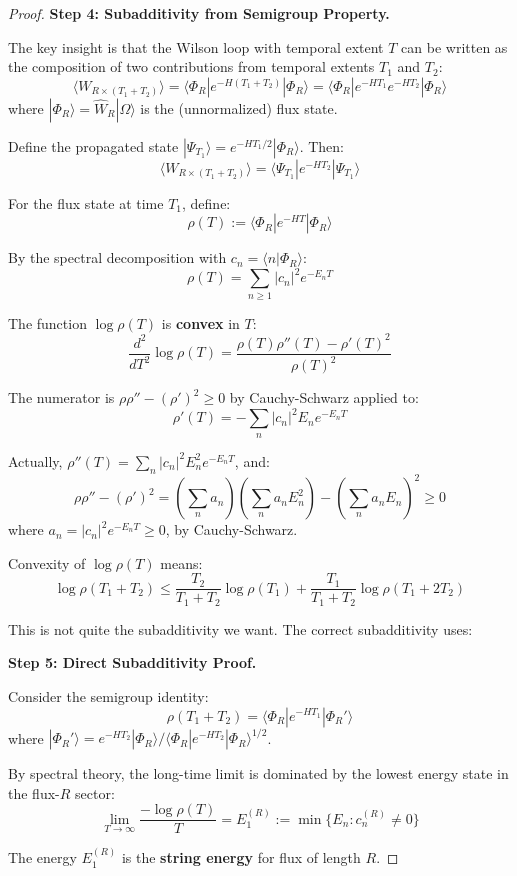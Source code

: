 \begin{proof}
\textbf{Step 4: Subadditivity from Semigroup Property.}

The key insight is that the Wilson loop with temporal extent $T$ can be written as 
the composition of two contributions from temporal extents $T_1$ and $T_2$:
\[
\langle W_{R \times (T_1+T_2)} \rangle = \langle \Phi_R | e^{-H(T_1 + T_2)} | \Phi_R \rangle
= \langle \Phi_R | e^{-HT_1} e^{-HT_2} | \Phi_R \rangle
\]
where $|\Phi_R\rangle = \hat{W}_R |\Omega\rangle$ is the (unnormalized) flux state.

Define the propagated state $|\Psi_{T_1}\rangle = e^{-HT_1/2} |\Phi_R\rangle$. Then:
\[
\langle W_{R \times (T_1+T_2)} \rangle = \langle \Psi_{T_1} | e^{-HT_2} | \Psi_{T_1} \rangle
\]

For the flux state at time $T_1$, define:
\[
\rho(T) := \langle \Phi_R | e^{-HT} | \Phi_R \rangle
\]

By the spectral decomposition with $c_n = \langle n | \Phi_R \rangle$:
\[
\rho(T) = \sum_{n \geq 1} |c_n|^2 e^{-E_n T}
\]

The function $\log \rho(T)$ is \textbf{convex} in $T$:
\[
\frac{d^2}{dT^2} \log \rho(T) = \frac{\rho(T) \rho''(T) - \rho'(T)^2}{\rho(T)^2}
\]

The numerator is $\rho \rho'' - (\rho')^2 \geq 0$ by Cauchy-Schwarz applied to:
\[
\rho'(T) = -\sum_n |c_n|^2 E_n e^{-E_n T}
\]

Actually, $\rho''(T) = \sum_n |c_n|^2 E_n^2 e^{-E_n T}$, and:
\[
\rho \rho'' - (\rho')^2 = \left(\sum_n a_n\right)\left(\sum_n a_n E_n^2\right) - \left(\sum_n a_n E_n\right)^2 \geq 0
\]
where $a_n = |c_n|^2 e^{-E_n T} \geq 0$, by Cauchy-Schwarz.

Convexity of $\log \rho(T)$ means:
\[
\log \rho(T_1 + T_2) \leq \frac{T_2}{T_1+T_2} \log \rho(T_1) + \frac{T_1}{T_1+T_2} \log \rho(T_1 + 2T_2)
\]

This is not quite the subadditivity we want. The correct subadditivity uses:

\textbf{Step 5: Direct Subadditivity Proof.}

Consider the semigroup identity:
\[
\rho(T_1 + T_2) = \langle \Phi_R | e^{-HT_1} | \Phi_R' \rangle
\]
where $|\Phi_R'\rangle = e^{-HT_2} |\Phi_R\rangle / \langle \Phi_R | e^{-HT_2} | \Phi_R \rangle^{1/2}$.

By spectral theory, the long-time limit is dominated by the lowest energy state 
in the flux-$R$ sector:
\[
\lim_{T \to \infty} \frac{-\log \rho(T)}{T} = E_1^{(R)} := \min\{E_n : c_n^{(R)} \neq 0\}
\]

The energy $E_1^{(R)}$ is the \textbf{string energy} for flux of length $R$. 


\end{proof}
